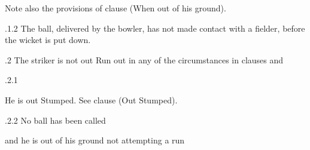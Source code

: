 \documentclass[12pt]{article}
\begin{document}
\vspace{\baselineskip}
\begin{adjustwidth}{1.12in}{0.0in}
{\fontsize{9pt}{10.8pt}\selectfont Note also the provisions of clause (When out of his ground).\par}\par

\end{adjustwidth}


\vspace{\baselineskip}
\begin{adjustwidth}{1.18in}{0.17in}
{\fontsize{9pt}{10.8pt}.1.2 \tabto{1.17in} The ball, delivered by the bowler, has not made contact with a fielder, before the wicket is put down.\par}\par

\end{adjustwidth}


\vspace{\baselineskip}
{\fontsize{9pt}{10.8pt}.2 \tabto{0.49in} The striker is not out Run out in any of the circumstances in clauses and \par}\par


\vspace{\baselineskip}
\begin{adjustwidth}{0.49in}{0.0in}
{\fontsize{9pt}{10.8pt}.2.1 \tabto{1.17in} {\fontsize{8pt}{9.6pt}\selectfont He is out Stumped. See clause (Out Stumped).\par}\par}\par

\end{adjustwidth}


\vspace{\baselineskip}
\begin{adjustwidth}{0.49in}{0.0in}
{\fontsize{9pt}{10.8pt}.2.2 \tabto{1.17in} No ball has been called\par}\par

\end{adjustwidth}


\vspace{\baselineskip}
\begin{adjustwidth}{1.12in}{0.0in}
{\fontsize{9pt}{10.8pt}\selectfont and he is out of his ground not attempting a run\par}\par

\end{adjustwidth}
\end{document}
